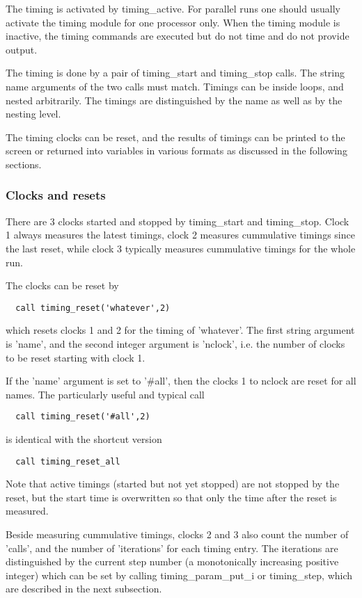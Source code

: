\documentclass[10pt]{article}
\begin{document}
The timing is activated by timing\_active. For parallel runs
one should usually activate the timing module for one processor only.
When the timing module is inactive, the timing commands are executed 
but do not time and do not provide output.

The timing is done by a pair of timing\_start and timing\_stop calls.
The string name arguments of the two calls must match. 
Timings can be inside loops, and nested arbitrarily. 
The timings are distinguished by the name as well as by the nesting level.

The timing clocks can be reset, and the results of timings can be printed 
to the screen or returned into variables in various formats as discussed 
in the following sections. 

\subsubsection{Clocks and resets}

There are 3 clocks started and stopped by timing\_start
and timing\_stop. Clock 1 always measures the latest timings,
clock 2 measures cummulative timings since the last reset,
while clock 3 typically measures cummulative timings for the whole run.

The clocks can be reset by
\begin{verbatim}
  call timing_reset('whatever',2)
\end{verbatim}
which resets clocks 1 and 2 for the timing of 'whatever'. 
The first string argument is 'name', and the second integer
argument is 'nclock', i.e. the number of clocks to be reset
starting with clock 1.

If the 'name' argument is set to '\#all', 
then the clocks 1 to nclock are reset for all names.
The particularly useful and typical call 
\begin{verbatim}
  call timing_reset('#all',2)
\end{verbatim}
is identical with the shortcut version
\begin{verbatim}
  call timing_reset_all
\end{verbatim}
Note that active timings (started but not yet stopped) are not stopped 
by the reset, but the start time is overwritten
so that only the time after the reset is measured.

Beside measuring cummulative timings, clocks 2 and 3 also count the number 
of 'calls', and the number of 'iterations' for each timing entry. 
The iterations are distinguished by the current step number 
(a monotonically increasing positive integer) which can be set by calling
timing\_param\_put\_i or timing\_step, which are
described in the next subsection.
\end{document}
